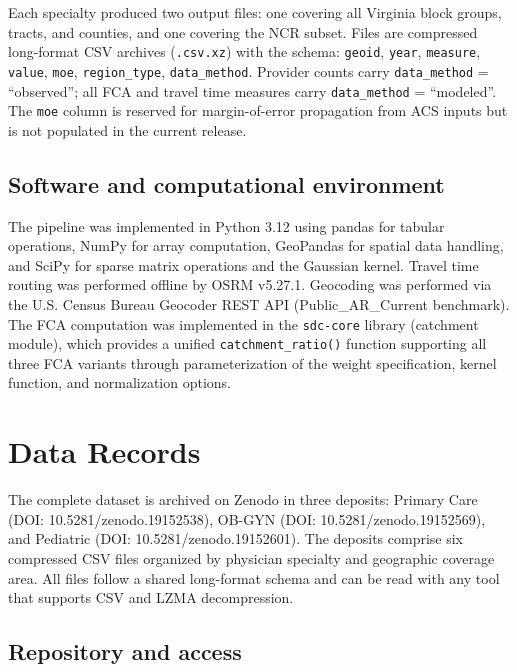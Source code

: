 \documentclass{CUP-JNL-DAP}%
\begin{document}
Each specialty produced two output files: one covering all Virginia block groups, tracts, and counties, and one covering the NCR subset. Files are compressed long-format CSV archives (\texttt{.csv.xz}) with the schema: \texttt{geoid}, \texttt{year}, \texttt{measure}, \texttt{value}, \texttt{moe}, \texttt{region\_type}, \texttt{data\_method}. Provider counts carry \texttt{data\_method} = ``observed''; all FCA and travel time measures carry \texttt{data\_method} = ``modeled''. The \texttt{moe} column is reserved for margin-of-error propagation from ACS inputs but is not populated in the current release.

\subsection{Software and computational environment}

The pipeline was implemented in Python 3.12 using pandas for tabular operations, NumPy for array computation, GeoPandas for spatial data handling, and SciPy for sparse matrix operations and the Gaussian kernel. Travel time routing was performed offline by OSRM v5.27.1. Geocoding was performed via the U.S. Census Bureau Geocoder REST API (Public\_AR\_Current benchmark). The FCA computation was implemented in the \texttt{sdc-core} library (catchment module), which provides a unified \texttt{catchment\_ratio()} function supporting all three FCA variants through parameterization of the weight specification, kernel function, and normalization options.


\section{Data Records}

The complete dataset is archived on Zenodo in three deposits: Primary Care (DOI: 10.5281/zenodo.19152538), OB-GYN (DOI: 10.5281/zenodo.19152569), and Pediatric (DOI: 10.5281/zenodo.19152601). The deposits comprise six compressed CSV files organized by physician specialty and geographic coverage area. All files follow a shared long-format schema and can be read with any tool that supports CSV and LZMA decompression.

\subsection{Repository and access}
\end{document}
